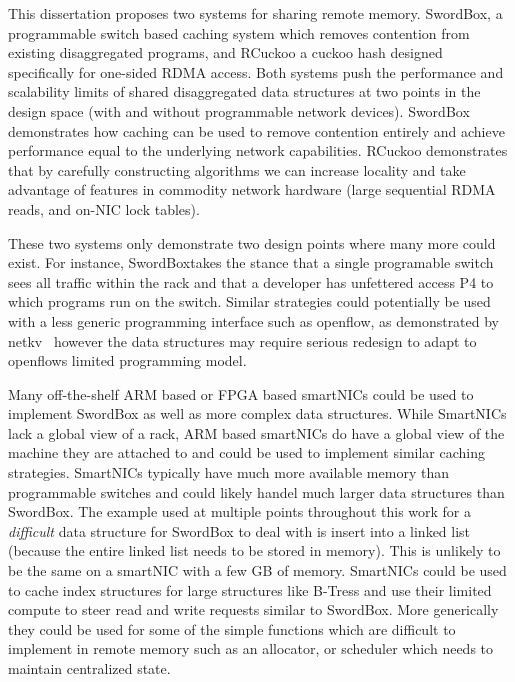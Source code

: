 \documentclass[12pt]{ucsddissertation}
\newcommand{\sword}{SwordBox}
\begin{document}
This dissertation proposes two systems for sharing remote memory. {\sword}, a programmable switch based
caching system which removes contention from existing disaggregated programs, and RCuckoo a cuckoo
hash designed specifically for one-sided RDMA access. Both systems push the performance and
scalability limits of shared disaggregated data structures at two points in the design space (with
and without programmable network devices). {\sword} demonstrates how caching can be used to remove
contention entirely and achieve performance equal to the underlying network capabilities. RCuckoo
demonstrates that by carefully constructing algorithms we can increase locality and take advantage
of features in commodity network hardware (large sequential RDMA reads, and on-NIC lock tables).

These two systems only demonstrate two design points where many more could exist. For instance,
\sword takes the stance that a single programable switch sees all traffic within the rack and
that a developer has unfettered access P4 to which programs run on the switch. Similar strategies
could potentially be used with a less generic programming interface such as openflow, as
demonstrated by netkv~\cite{netkv} however the data structures may require serious redesign to adapt
to openflows limited programming model.

Many off-the-shelf ARM based or FPGA based smartNICs could be used to implement {\sword} as well as
more complex data structures. While SmartNICs lack a global view of a rack, ARM based smartNICs do
have a global view of the machine they are attached to and could be used to implement similar
caching strategies. SmartNICs typically have much more available memory than programmable switches
and could likely handel much larger data structures than {\sword}. The example used at multiple points
throughout this work for a \textit{difficult} data structure for {\sword} to deal with is insert into
a linked list (because the entire linked list needs to be stored in memory). This is unlikely to be
the same on a smartNIC with a few GB of memory. SmartNICs could be used to cache index structures
for large structures like B-Tress and use their limited compute to steer read and write requests
similar to {\sword}. More generically they could be used for some of the simple functions which are
difficult to implement in remote memory such as an allocator, or scheduler which needs to maintain
centralized state.
\end{document}

